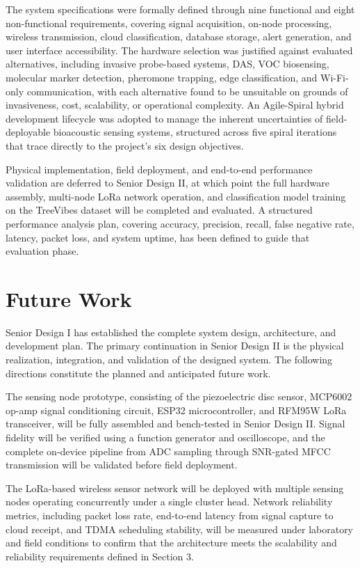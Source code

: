 \documentclass[12pt,a4paper,oneside]{memoir}
\begin{document}
The system specifications were formally defined through nine functional and eight non-functional requirements, covering signal acquisition, on-node processing, wireless transmission, cloud classification, database storage, alert generation, and user interface accessibility. The hardware selection was justified against evaluated alternatives, including invasive probe-based systems, DAS, VOC biosensing, molecular marker detection, pheromone trapping, edge classification, and Wi-Fi-only communication, with each alternative found to be unsuitable on grounds of invasiveness, cost, scalability, or operational complexity. An Agile-Spiral hybrid development lifecycle was adopted to manage the inherent uncertainties of field-deployable bioacoustic sensing systems, structured across five spiral iterations that trace directly to the project’s six design objectives.

Physical implementation, field deployment, and end-to-end performance validation are deferred to Senior Design II, at which point the full hardware assembly, multi-node LoRa network operation, and classification model training on the TreeVibes dataset will be completed and evaluated. A structured performance analysis plan, covering accuracy, precision, recall, false negative rate, latency, packet loss, and system uptime, has been defined to guide that evaluation phase.

\section{Future Work}
\label{sec:futurework}

Senior Design I has established the complete system design, architecture, and development plan. The primary continuation in Senior Design II is the physical realization, integration, and validation of the designed system. The following directions constitute the planned and anticipated future work.

The sensing node prototype, consisting of the piezoelectric disc sensor, MCP6002 op-amp signal conditioning circuit, ESP32 microcontroller, and RFM95W LoRa transceiver, will be fully assembled and bench-tested in Senior Design II. Signal fidelity will be verified using a function generator and oscilloscope, and the complete on-device pipeline from ADC sampling through SNR-gated MFCC transmission will be validated before field deployment.

The LoRa-based wireless sensor network will be deployed with multiple sensing nodes operating concurrently under a single cluster head. Network reliability metrics, including packet loss rate, end-to-end latency from signal capture to cloud receipt, and TDMA scheduling stability, will be measured under laboratory and field conditions to confirm that the architecture meets the scalability and reliability requirements defined in Section 3.
\end{document}

